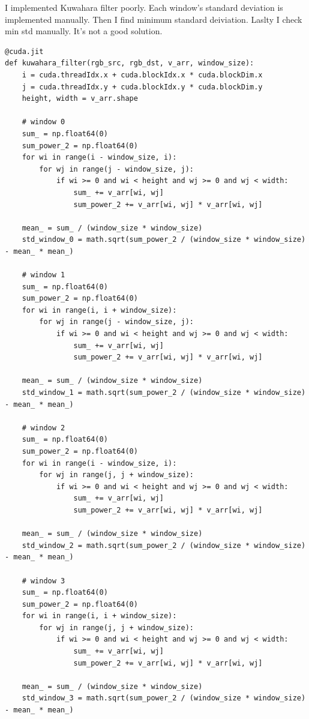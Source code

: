 \documentclass{article}
\begin{document}
I implemented Kuwahara filter poorly. Each window's standard deviation is implemented manually. Then I find minimum standard deiviation. Laslty I check min std manually. It's not a good solution.
\begin{verbatim}
@cuda.jit
def kuwahara_filter(rgb_src, rgb_dst, v_arr, window_size):
    i = cuda.threadIdx.x + cuda.blockIdx.x * cuda.blockDim.x
    j = cuda.threadIdx.y + cuda.blockIdx.y * cuda.blockDim.y
    height, width = v_arr.shape
    
    # window 0
    sum_ = np.float64(0)
    sum_power_2 = np.float64(0)
    for wi in range(i - window_size, i):
        for wj in range(j - window_size, j):
            if wi >= 0 and wi < height and wj >= 0 and wj < width:
                sum_ += v_arr[wi, wj]
                sum_power_2 += v_arr[wi, wj] * v_arr[wi, wj]
            
    mean_ = sum_ / (window_size * window_size)
    std_window_0 = math.sqrt(sum_power_2 / (window_size * window_size) - mean_ * mean_)
    
    # window 1
    sum_ = np.float64(0)
    sum_power_2 = np.float64(0)
    for wi in range(i, i + window_size):
        for wj in range(j - window_size, j):
            if wi >= 0 and wi < height and wj >= 0 and wj < width:
                sum_ += v_arr[wi, wj]
                sum_power_2 += v_arr[wi, wj] * v_arr[wi, wj]
            
    mean_ = sum_ / (window_size * window_size)
    std_window_1 = math.sqrt(sum_power_2 / (window_size * window_size) - mean_ * mean_)
    
    # window 2
    sum_ = np.float64(0)
    sum_power_2 = np.float64(0)
    for wi in range(i - window_size, i):
        for wj in range(j, j + window_size):
            if wi >= 0 and wi < height and wj >= 0 and wj < width:
                sum_ += v_arr[wi, wj]
                sum_power_2 += v_arr[wi, wj] * v_arr[wi, wj]
            
    mean_ = sum_ / (window_size * window_size)
    std_window_2 = math.sqrt(sum_power_2 / (window_size * window_size) - mean_ * mean_)
    
    # window 3
    sum_ = np.float64(0)
    sum_power_2 = np.float64(0)
    for wi in range(i, i + window_size):
        for wj in range(j, j + window_size):
            if wi >= 0 and wi < height and wj >= 0 and wj < width:
                sum_ += v_arr[wi, wj]
                sum_power_2 += v_arr[wi, wj] * v_arr[wi, wj]
            
    mean_ = sum_ / (window_size * window_size)
    std_window_3 = math.sqrt(sum_power_2 / (window_size * window_size) - mean_ * mean_)
    

\end{verbatim}
\end{document}
